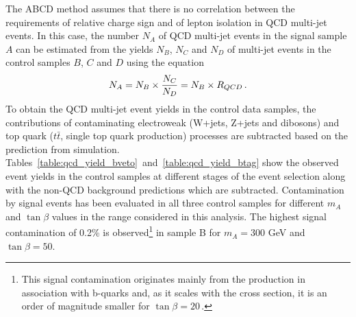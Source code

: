 The ABCD method assumes that there is no correlation between the requirements of relative 
charge sign and of lepton isolation in QCD multi-jet events. In this case, the number $N_{A}$ of QCD multi-jet events in the signal sample $A$ 
can be estimated from the yields $N_B$, $N_C$ and $N_D$  of multi-jet events in the control samples $B$, $C$ and $D$ using the equation
\begin{equation} \label{eqn:qcdest}
N_{A}  = N_{B} \times \frac{N_{C}}{N_{D}} =  N_{B} \times R_{QCD} \,.
\end{equation}
To obtain the  QCD multi-jet event yields in the control data samples, the contributions of
contaminating electroweak (W+jets, Z+jets and dibosons) and top quark 
($t\bar{t}$,  single top quark production) processes are  subtracted based on the prediction from simulation.
Tables~\ref{table:qcd_yield_bveto}~and~\ref{table:qcd_yield_btag}
show the observed event yields in the control samples at different stages of the event selection along with the
non-QCD background predictions  which are subtracted.
Contamination by signal events has been evaluated in all  three control samples for different  $m_{A}$ and $\tan\beta$ values in the
range considered in this analysis. The highest signal contamination of 0.2\% is observed\footnote{
This signal contamination originates mainly from the production in association with b-quarks and,
as it scales with the cross section, it is an order of magnitude smaller for $\tan\beta = 20\,.$
} in sample B for $m_{A} = 300$ GeV and $\tan\beta = 50$.

